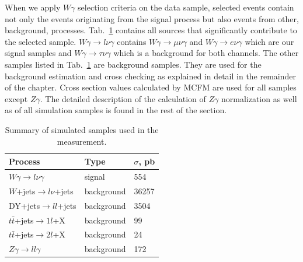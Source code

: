 When we apply $W\gamma$ selection criteria on the data sample, selected events contain not only the events originating from the signal process but also events from other, background, processes. Tab.~\ref{tab:mc_bkg_samples} contains all sources that significantly contribute to the selected sample. $W\gamma \rightarrow l\nu\gamma$ contains $W\gamma \rightarrow \mu\nu\gamma$ and $W\gamma \rightarrow e\nu\gamma$ which are our signal samples and $W\gamma \rightarrow \tau\nu\gamma$ which is a background for both channels. The other samples listed in Tab.~\ref{tab:mc_bkg_samples} are background samples. They are used for the background estimation and cross checking as explained in detail in the remainder of the chapter. Cross section values calculated by MCFM are used for all samples except $Z\gamma$. The detailed description of the calculation of $Z\gamma$ normalization as well as of all simulation samples is found in the rest of the section.

\begin{table}[h]
  \small
  \begin{center}
    \caption{Summary of simulated samples used in the measurement.}
    \begin{tabular}{|l|l|l|}
      \hline
      Process                              & Type & $\sigma$, pb  \\ \hline
      $W\gamma \rightarrow l\nu\gamma$     & signal & 554   \\ \hline %
      $W$+jets$ \rightarrow l\nu $+jets   & background & 36257  \\ \hline %
      DY+jets$ \rightarrow ll $+jets     & background & 3504  \\ \hline %
      $t\bar{t}$+jets$\rightarrow 1l$+X    & background & 99    \\ \hline %
      $t\bar{t}$+jets$\rightarrow 2l$+X    & background & 24    \\ \hline
      $Z\gamma \rightarrow ll\gamma$       & background & 172   \\ \hline
    \end{tabular}
    \label{tab:mc_bkg_samples}
  \end{center}
\end{table} 

